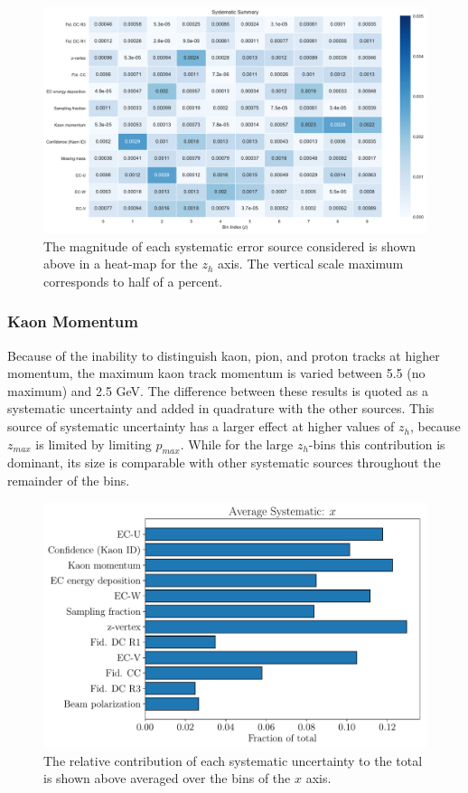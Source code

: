 \begin{figure}
	\label{fig:systematic_heatmap_z}
	\begin{center}
		\includegraphics[width=14cm]{image/plots/kaon-bsa/systematics_integrated_heatmap_z.pdf}
		\caption{The magnitude of each systematic error source considered is shown above in a heat-map for the $z_h$ axis.  The vertical scale maximum corresponds to half of a percent.}
	\end{center}
\end{figure}

\subsubsection*{Kaon Momentum}
Because of the inability to distinguish kaon, pion, and proton tracks at higher momentum, the maximum kaon track momentum is varied between 5.5 (no maximum) and 2.5 GeV.  The difference between these results is quoted as a systematic uncertainty and added in quadrature with the other sources.  This source of systematic uncertainty has a larger effect at higher values of $z_h$, because $z_{max}$ is limited by limiting $p_{max}$.  While for the large $z_h$-bins this contribution is dominant, its size is comparable with other systematic sources throughout the remainder of the bins.  

\begin{figure}
	\centering
	\includegraphics[width=16cm]{image/plots/kaon-bsa/bar-systematics-x.pdf}
	\caption{The relative contribution of each systematic uncertainty to the total is shown above averaged over the bins of the $x$ axis.}
\end{figure}

